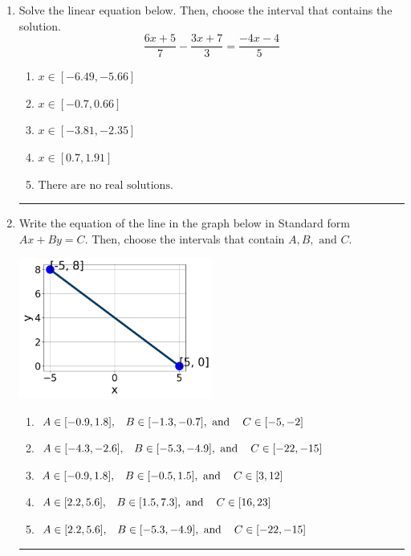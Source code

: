 \documentclass[14pt]{extbook}
\newcommand{\litem}[1]{\item#1\hspace*{-1cm}\rule{\textwidth}{0.4pt}}
\begin{document}
\begin{enumerate}
{\begin{enumerate}[label=\Alph*.]
\end{enumerate} }
\litem{
Solve the linear equation below. Then, choose the interval that contains the solution.\[ \frac{6x + 5}{7} - \frac{3x + 7}{3} = \frac{-4x -4}{5} \]\begin{enumerate}[label=\Alph*.]
\item \( x \in [-6.49, -5.66] \)
\item \( x \in [-0.7, 0.66] \)
\item \( x \in [-3.81, -2.35] \)
\item \( x \in [0.7, 1.91] \)
\item \( \text{There are no real solutions.} \)

\end{enumerate} }
\litem{
Write the equation of the line in the graph below in Standard form $Ax+By=C$. Then, choose the intervals that contain $A, B, \text{ and } C$.
\begin{center}
    \includegraphics[width=0.5\textwidth]{../Figures/linearGraphToStandardCopyA.png}
\end{center}
\begin{enumerate}[label=\Alph*.]
\item \( A \in [-0.9, 1.8], \hspace{3mm} B \in [-1.3, -0.7], \text{ and } \hspace{3mm} C \in [-5, -2] \)
\item \( A \in [-4.3, -2.6], \hspace{3mm} B \in [-5.3, -4.9], \text{ and } \hspace{3mm} C \in [-22, -15] \)
\item \( A \in [-0.9, 1.8], \hspace{3mm} B \in [-0.5, 1.5], \text{ and } \hspace{3mm} C \in [3, 12] \)
\item \( A \in [2.2, 5.6], \hspace{3mm} B \in [1.5, 7.3], \text{ and } \hspace{3mm} C \in [16, 23] \)
\item \( A \in [2.2, 5.6], \hspace{3mm} B \in [-5.3, -4.9], \text{ and } \hspace{3mm} C \in [-22, -15] \)


\end{enumerate}}
\end{enumerate}
\end{document}
